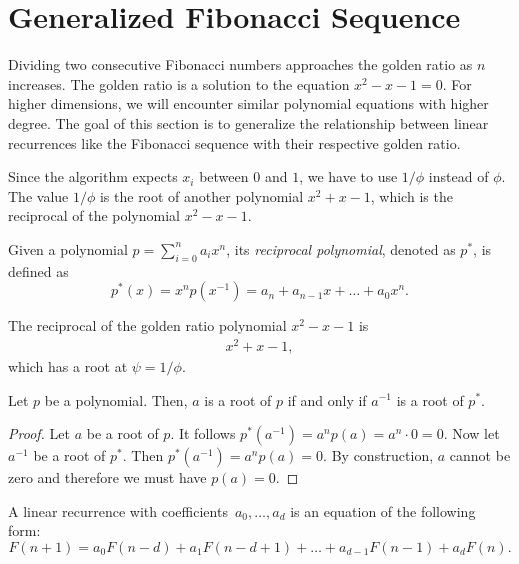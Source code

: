 \documentclass[english,version-2020-11]{uzl-thesis}
\begin{document}
\section{Generalized Fibonacci Sequence}

Dividing two consecutive Fibonacci numbers approaches the golden ratio as $n$ increases.
The golden ratio is a solution to the equation $x^2 - x - 1 = 0$.
For higher dimensions, we will encounter similar polynomial equations with higher degree.
The goal of this section is to generalize the relationship between linear
recurrences like the Fibonacci sequence with their respective golden ratio.

Since the algorithm expects $x_i$ between $0$ and $1$, we have to use $1/\phi$ instead of $\phi$.
The value $1/\phi$ is the root of another polynomial $x^2 + x - 1$, which is the reciprocal
of the polynomial $x^2 - x - 1$.

\begin{definition}
  Given a polynomial $p = \sum_{i=0}^n a_i x^n$, its \emph{reciprocal polynomial},
  denoted as $p^*$, is defined as
  \[
    p^*(x) = x^n p(x^{-1}) = a_n + a_{n-1} x + \dots + a_0 x^n.
  \]
\end{definition}

\begin{example}
  The reciprocal of the golden ratio polynomial $x^2 - x - 1$ is
  \begin{align*}
    x^2 + x - 1,
  \end{align*}
  which has a root at $\psi = 1/\phi$.
\end{example}

\begin{lemma}
  Let $p$ be a polynomial. Then, $a$ is a root of $p$ if and only if $a^{-1}$ is a root of $p^*$.
\end{lemma}

\begin{proof}
  Let $a$ be a root of $p$. It follows $p^*(a^{-1}) = a^n p(a) = a^n \cdot 0 = 0$.
  Now let $a^{-1}$ be a root of $p^*$. Then $p^*(a^{-1}) = a^n p(a) = 0$.
  By construction, $a$ cannot be zero and therefore we must have $p(a) = 0$.
\end{proof}

\begin{definition}
  A linear recurrence with coefficients~$a_0, \dots, a_d$ is an equation of the
  following form:
  \[
    F(n + 1) = a_0 F(n - d) + a_1 F(n - d + 1) + \dots + a_{d-1} F(n - 1) + a_d F(n).
  \]
\end{definition}
\end{document}
